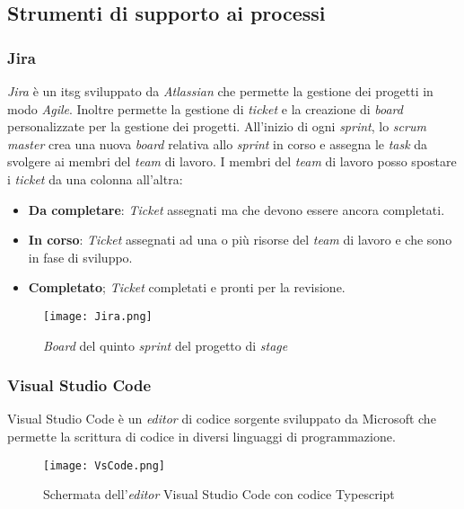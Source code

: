 \subsection{Strumenti di supporto ai processi}
\subsubsection{Jira}
\textit{Jira} è un \gls{itsg} sviluppato da \textit{Atlassian} che permette la gestione dei progetti in modo \textit{Agile}. Inoltre permette la gestione di \textit{ticket} e la creazione di \textit{board} personalizzate per la gestione dei progetti.
All'inizio di ogni \textit{sprint}, lo \textit{scrum master} crea una nuova \textit{board} relativa allo \textit{sprint} in corso e assegna le \textit{task} da svolgere ai membri del \textit{team} di lavoro.
I membri del \textit{team} di lavoro posso spostare i \textit{ticket} da una colonna all'altra: 
\begin{itemize}
    \item \textbf{Da completare}: \textit{Ticket} assegnati ma che devono essere ancora completati.
    \item \textbf{In corso}: \textit{Ticket} assegnati ad una o più risorse del \textit{team} di lavoro e che sono in fase di sviluppo.
    \item \textbf{Completato}; \textit{Ticket} completati e pronti per la revisione.
\end{itemize}
\begin{figure}[H]
    \centering
    \texttt{[image: Jira.png]}
    \caption{\textit{Board} del quinto \textit{sprint} del progetto di \textit{stage}}
    \label{fig:Jira}
\end{figure}
\subsubsection{Visual Studio Code}
Visual Studio Code è un \textit{editor} di codice sorgente sviluppato da Microsoft che permette la scrittura di codice in diversi linguaggi di programmazione.
\begin{figure}[H]
    \centering
    \texttt{[image: VsCode.png]}
    \caption{Schermata dell'\textit{editor} Visual Studio Code con codice Typescript}
    \label{fig:VsCode}
\end{figure}
